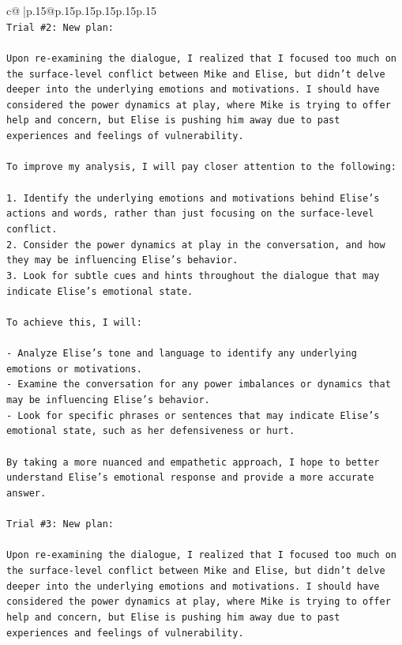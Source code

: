 \documentclass{article}
\begin{document}
{\begin{supertabular}{c@{$\;$}|p{.15\linewidth}@{}p{.15\linewidth}p{.15\linewidth}p{.15\linewidth}p{.15\linewidth}p{.15\linewidth}}
{{{\\ 
\texttt{Trial \#2: New plan: } \\
\\ 
\texttt{Upon re{-}examining the dialogue, I realized that I focused too much on the surface{-}level conflict between Mike and Elise, but didn't delve deeper into the underlying emotions and motivations. I should have considered the power dynamics at play, where Mike is trying to offer help and concern, but Elise is pushing him away due to past experiences and feelings of vulnerability. } \\
\\ 
\texttt{To improve my analysis, I will pay closer attention to the following:} \\
\\ 
\texttt{1. Identify the underlying emotions and motivations behind Elise's actions and words, rather than just focusing on the surface{-}level conflict.} \\
\texttt{2. Consider the power dynamics at play in the conversation, and how they may be influencing Elise's behavior.} \\
\texttt{3. Look for subtle cues and hints throughout the dialogue that may indicate Elise's emotional state.} \\
\\ 
\texttt{To achieve this, I will:} \\
\\ 
\texttt{{-} Analyze Elise's tone and language to identify any underlying emotions or motivations.} \\
\texttt{{-} Examine the conversation for any power imbalances or dynamics that may be influencing Elise's behavior.} \\
\texttt{{-} Look for specific phrases or sentences that may indicate Elise's emotional state, such as her defensiveness or hurt.} \\
\\ 
\texttt{By taking a more nuanced and empathetic approach, I hope to better understand Elise's emotional response and provide a more accurate answer.} \\
\\ 
\texttt{Trial \#3: New plan: } \\
\\ 
\texttt{Upon re{-}examining the dialogue, I realized that I focused too much on the surface{-}level conflict between Mike and Elise, but didn't delve deeper into the underlying emotions and motivations. I should have considered the power dynamics at play, where Mike is trying to offer help and concern, but Elise is pushing him away due to past experiences and feelings of vulnerability. } \\
}}}
\end{supertabular}}
\end{document}
